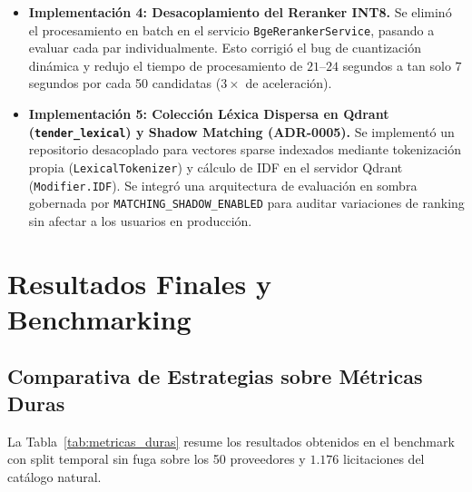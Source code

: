 \documentclass[11pt,a4paper]{article}
\begin{document}
\begin{itemize}[leftmargin=*]
    \item \textbf{Implementación 4: Desacoplamiento del Reranker INT8.}
    Se eliminó el procesamiento en batch en el servicio \texttt{BgeRerankerService}, pasando a evaluar cada par individualmente. Esto corrigió el bug de cuantización dinámica y redujo el tiempo de procesamiento de $21$--$24$ segundos a tan solo $7$ segundos por cada 50 candidatas ($3\times$ de aceleración).

    \item \textbf{Implementación 5: Colección Léxica Dispersa en Qdrant (\texttt{tender\_lexical}) y Shadow Matching (ADR-0005).}
    Se implementó un repositorio desacoplado para vectores sparse indexados mediante tokenización propia (\texttt{LexicalTokenizer}) y cálculo de IDF en el servidor Qdrant (\texttt{Modifier.IDF}). Se integró una arquitectura de evaluación en sombra gobernada por \texttt{MATCHING\_SHADOW\_ENABLED} para auditar variaciones de ranking sin afectar a los usuarios en producción.
\end{itemize}

\section{Resultados Finales y Benchmarking}

\subsection{Comparativa de Estrategias sobre Métricas Duras}
La Tabla~\ref{tab:metricas_duras} resume los resultados obtenidos en el benchmark con split temporal sin fuga sobre los 50 proveedores y $1.176$ licitaciones del catálogo natural.
\end{document}

